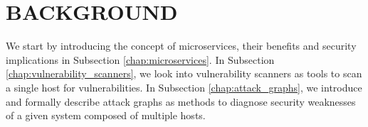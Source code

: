 \section{BACKGROUND}
\label{chap:background}

We start by introducing the concept of microservices, their benefits and security implications in Subsection \ref{chap:microservices}. In Subsection \ref{chap:vulnerability_scanners}, we look into vulnerability scanners as tools to scan a single host for vulnerabilities. In Subsection \ref{chap:attack_graphs}, we introduce and formally describe attack graphs as methods to diagnose security weaknesses of a given system composed of multiple hosts.





